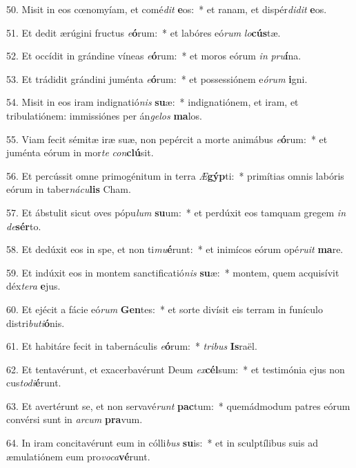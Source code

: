 50. Misit in eos cœnomyíam, et comé\textit{dit} \textbf{e}os:~*  et ranam, et dispér\textit{di}\textit{dit} \textbf{e}os.\

51. Et dedit ærúgini fructus \textit{e}\textbf{ó}rum:~*  et labóres eó\textit{rum} \textit{lo}\textbf{cús}tæ.\

52. Et occídit in grándine víneas \textit{e}\textbf{ó}rum:~*  et moros eórum \textit{in} \textit{pru}\textbf{í}na.\

53. Et trádidit grándini juménta \textit{e}\textbf{ó}rum:~*  et possessiónem e\textit{ó}\textit{rum} \textbf{i}gni.\

54. Misit in eos iram indignatió\textit{nis} \textbf{su}æ:~*  indignatiónem, et iram, et tribulatiónem: immissiónes per án\textit{ge}\textit{los} \textbf{ma}los.\

55. Viam fecit sémitæ iræ suæ, non pepércit a morte animábus \textit{e}\textbf{ó}rum:~*  et juménta eórum in mor\textit{te} \textit{con}\textbf{clú}sit.\

56. Et percússit omne primogénitum in terra \textit{Æ}\textbf{gýp}ti:~*  primítias omnis labóris eórum in taber\textit{ná}\textit{cu}\textbf{lis} Cham.\

57. Et ábstulit sicut oves pópu\textit{lum} \textbf{su}um:~*  et perdúxit eos tamquam gregem \textit{in} \textit{de}\textbf{sér}to.\

58. Et dedúxit eos in spe, et non ti\textit{mu}\textbf{é}runt:~*  et inimícos eórum opé\textit{ru}\textit{it} \textbf{ma}re.\

59. Et indúxit eos in montem sanctificatió\textit{nis} \textbf{su}æ:~*  montem, quem acquisívit déx\textit{te}\textit{ra} \textbf{e}jus.\

60. Et ejécit a fácie eó\textit{rum} \textbf{Gen}tes:~*  et sorte divísit eis terram in funículo distri\textit{bu}\textit{ti}\textbf{ó}nis.\

61. Et habitáre fecit in tabernáculis \textit{e}\textbf{ó}rum:~*  \textit{tri}\textit{bus} \textbf{Is}raël.\

62. Et tentavérunt, et exacerbavérunt Deum \textit{ex}\textbf{cél}sum:~*  et testimónia ejus non cus\textit{to}\textit{di}\textbf{é}runt.\

63. Et avertérunt se, et non servavé\textit{runt} \textbf{pac}tum:~*  quemádmodum patres eórum convérsi sunt in \textit{ar}\textit{cum} \textbf{pra}vum.\

64. In iram concitavérunt eum in cólli\textit{bus} \textbf{su}is:~*  et in sculptílibus suis ad æmulatiónem eum pro\textit{vo}\textit{ca}\textbf{vé}runt.\

